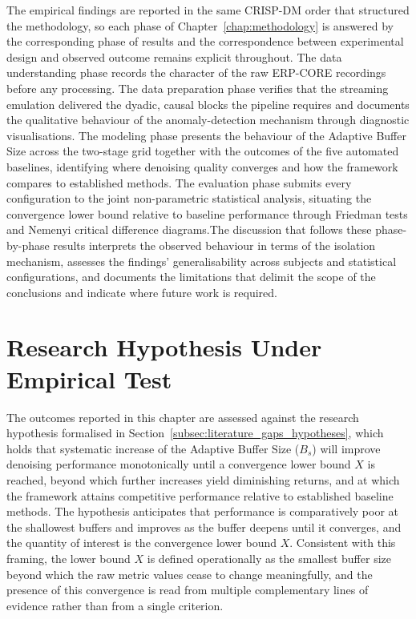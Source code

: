 \documentclass[MScCS,12pt,oneside,final]{uccthesis}
\begin{document}
The empirical findings are reported in the same CRISP-DM order that structured the methodology, so each phase of Chapter~\ref{chap:methodology} is answered by the corresponding phase of results and the correspondence between experimental design and observed outcome remains explicit throughout. The data understanding phase records the character of the raw ERP-CORE recordings before any processing. The data preparation phase verifies that the streaming emulation delivered the dyadic, causal blocks the pipeline requires and documents the qualitative behaviour of the anomaly-detection mechanism through diagnostic visualisations. The modeling phase presents the behaviour of the Adaptive Buffer Size across the two-stage grid together with the outcomes of the five automated baselines, identifying where denoising quality converges and how the framework compares to established methods. The evaluation phase submits every configuration to the joint non-parametric statistical analysis, situating the convergence lower bound relative to baseline performance through Friedman tests and Nemenyi critical difference diagrams.The discussion that follows these phase-by-phase results interprets the observed behaviour in terms of the isolation mechanism, assesses the findings' generalisability across subjects and statistical configurations, and documents the limitations that delimit the scope of the conclusions and indicate where future work is required.

\section{Research Hypothesis Under Empirical Test}
\label{sec:results_hypotheses}

The outcomes reported in this chapter are assessed against the research hypothesis formalised in Section~\ref{subsec:literature_gaps_hypotheses}, which holds that systematic increase of the Adaptive Buffer Size ($B_s$) will improve denoising performance monotonically until a convergence lower bound $X$ is reached, beyond which further increases yield diminishing returns, and at which the framework attains competitive performance relative to established baseline methods. The hypothesis anticipates that performance is comparatively poor at the shallowest buffers and improves as the buffer deepens until it converges, and the quantity of interest is the convergence lower bound $X$. Consistent with this framing, the lower bound $X$ is defined operationally as the smallest buffer size beyond which the raw metric values cease to change meaningfully, and the presence of this convergence is read from multiple complementary lines of evidence rather than from a single criterion.
\end{document}
